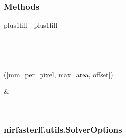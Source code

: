 \documentclass[letterpaper,10pt,english]{sphinxmanual}
\begin{document}
\begin{fulllineitems}
\subsubsection*{Methods}


\begin{savenotes}
\sphinxatlongtablestart
\sphinxthistablewithglobalstyle
\sphinxthistablewithnovlinesstyle
\makeatletter
  \LTleft \@totalleftmargin plus1fill
  \LTright\dimexpr\columnwidth-\@totalleftmargin-\linewidth\relax plus1fill
\makeatother
\begin{longtable}{}
\sphinxtoprule
\endfirsthead

\\
\sphinxtoprule
\endhead

\sphinxbottomrule
{}\\
\endfoot

\endlastfoot
\sphinxtableatstartofbodyhook
\begin{varwidth}[t]{}
\sphinxAtStartPar
{\hyperref[\detokenize{_autosummary/nirfasterff.utils.MeshingParams2D:nirfasterff.utils.MeshingParams2D.__init__}]{}}({[}mm\_per\_pixel, max\_area, offset{]})
\sphinxbeforeendvarwidth
\end{varwidth}%
&\begin{varwidth}[t]{}
\sphinxAtStartPar

\sphinxbeforeendvarwidth
\end{varwidth}%
\\
\sphinxbottomrule
\end{longtable}
\sphinxtableafterendhook
\sphinxatlongtableend
\end{savenotes}

\end{fulllineitems}


\sphinxstepscope


\subsubsection{nirfasterff.utils.SolverOptions}
\label{\detokenize{_autosummary/nirfasterff.utils.SolverOptions:nirfasterff-utils-solveroptions}}\label{\detokenize{_autosummary/nirfasterff.utils.SolverOptions::doc}}
\end{document}
